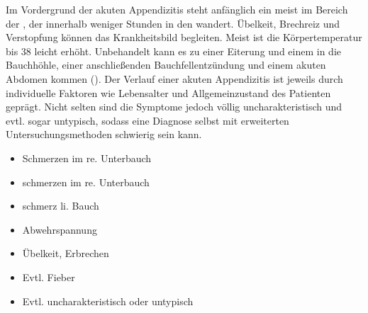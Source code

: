 {%
Im Vordergrund der akuten Appendizitis
steht anfänglich  ein meist  im Bereich der
, der
innerhalb weniger Stunden in den 
wandert. Übelkeit, Brechreiz und Verstopfung können
das Krankheitsbild begleiten. Meist ist die Körpertemperatur
bis 38\DegC{} leicht erhöht. 
Unbehandelt kann es zu einer
Eiterung und einem  in die Bauchhöhle, einer
anschließenden Bauchfellentzündung und einem akuten Abdomen
kommen ().
Der Verlauf einer akuten Appendizitis ist jeweils durch
individuelle Faktoren wie Lebensalter und Allgemeinzustand
des Patienten geprägt. Nicht selten sind die Symptome jedoch
völlig uncharakteristisch und evtl. sogar untypisch, sodass
eine Diagnose selbst mit erweiterten Untersuchungsmethoden
schwierig sein kann.

}{
\begin{itemize}
  \item Schmerzen im re. Unterbauch
  \item {}schmerzen im re. Unterbauch
  \item {}schmerz li. Bauch
  \item Abwehrspannung
  \item Übelkeit, Erbrechen
  \item Evtl. Fieber
  \item Evtl. uncharakteristisch oder untypisch
\end{itemize}
}{}{}{}



% 
% 



